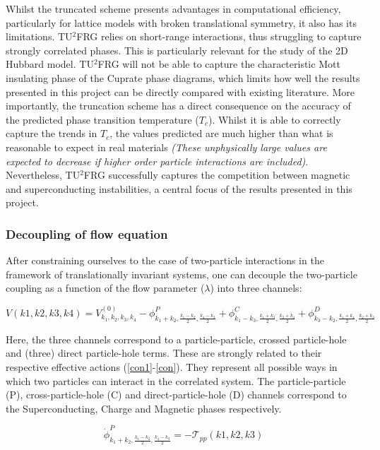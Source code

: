 \documentclass[12pt]{article}
\begin{document}
\noindent Whilst the truncated scheme presents advantages in computational efficiency, particularly for lattice models with broken translational symmetry, it also has its limitations. 
TU$^2$FRG relies on short-range interactions, thus struggling to capture strongly correlated phases. 
This is particularly relevant for the study of the 2D Hubbard model. TU$^2$FRG will not be able to capture
the characteristic Mott insulating phase of the Cuprate phase diagrams\cite{imada1998metal}, which limits how well the results presented in this project can be directly compared with existing literature. 
More importantly, the truncation scheme has a direct consequence on the accuracy of the predicted phase transition temperature ($T_c$). Whilst it is able to correctly capture
the trends in $T_c$, the values predicted are much higher than what is reasonable to expect in real materials \textit{(These unphysically large values are expected to decrease if higher order particle interactions are included)}.
Nevertheless, TU$^2$FRG successfully captures the competition between magnetic and superconducting instabilities, a central focus of the results presented in this project. 
\subsubsection{Decoupling of flow equation}
After constraining ourselves to the case of two-particle interactions in the framework of translationally invariant systems, one can decouple the two-particle coupling as a function of the flow parameter ($\lambda$) into three channels:

\begin{equation} \label{V decoupling}
    V(k1,k2,k3,k4)= V_{k_1, k_2, k_3, k_4}^{(0)} - \phi^{P}_{k_1 +k_2, \frac{k_1 - k_2}{2}, \frac{k_4-k_3}{2}} + \phi^{C}_{k_1 - k_3, \frac{k_1 +k_3}{2}, \frac{k_2+k_4}{2}} +\phi^{D}_{k_3- k_2, \frac{k_1 + k_4}{2}, \frac{k_2+k_3}{2}}
\end{equation}

\noindent Here, the three channels correspond to a particle-particle, crossed particle-hole and (three) direct particle-hole terms. These are strongly related to their respective effective actions (\ref{con1}-\ref{con}). They represent all possible ways in which two particles can interact in the correlated system. The particle-particle (P), cross-particle-hole (C) and direct-particle-hole (D) channels
correspond to the Superconducting, Charge and Magnetic phases respectively. 

\begin{equation}\label{con1}
    \dot{\phi}^{P}_{k_1 +k_2, \frac{k_1 - k_2}{2}, \frac{k_4-k_3}{2}} = - \mathcal{T}_{pp}(k1,k2,k3)
\end{equation}
\end{document}
